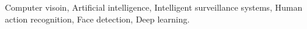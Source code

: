Computer visoin, Artificial intelligence, Intelligent surveillance systems, Human action recognition, Face detection, Deep learning.
